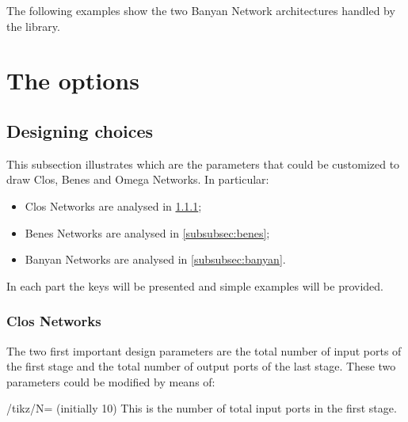\documentclass{ltxdoc}
\begin{document}
The following examples show the two Banyan Network architectures handled by the library.

\begin{minipage}{0.99\textwidth}
\begin{codeexample}[]
\end{codeexample}
\end{minipage}

\section{The options}
\subsection{Designing choices}
This subsection illustrates which are the parameters that could be customized to draw Clos, Benes and Omega Networks. In particular:
\begin{itemize}
\item Clos Networks are analysed in \ref{subsubsec:clos};
\item Benes Networks are analysed in \ref{subsubsec:benes};
\item Banyan Networks are analysed in \ref{subsubsec:banyan}.
\end{itemize}
In each part the keys will be presented and simple examples will be provided. 

\subsubsection{Clos Networks}
\label{subsubsec:clos}
The two first important design parameters are the total number of input ports of the first stage and the total number of output ports of the last stage. These two parameters could be modified by means of:

\begin{key}{/tikz/N= (initially 10)}
    This is the number of total input ports in the first stage.
\end{key}
\end{document}
